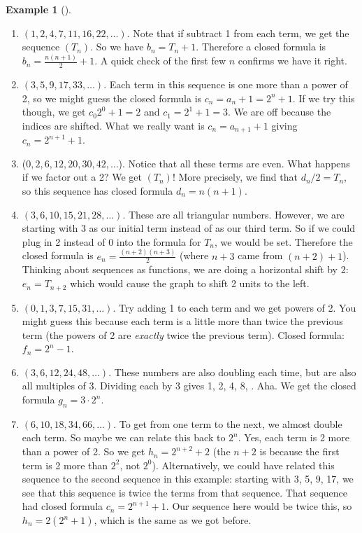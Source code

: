 \documentclass[12pt,]{book}
\theoremstyle{plain}
\theoremstyle{definition}
\theoremstyle{definition}
\newtheorem{example}[theorem]{Example}
\theoremstyle{definition}
\numberwithin{equation}{chapter}
\begin{document}
\begin{example}[]
\begin{enumerate}
\item\hypertarget{li-42}{}\hypertarget{p-70}{}%
\((1, 2, 4, 7, 11, 16, 22, \ldots)\). Note that if subtract 1 from each term, we get the sequence \((T_n)\). So we have \(b_n = T_n + 1\). Therefore a closed formula is \(b_n = \frac{n(n+1)}{2} + 1\). A quick check of the first few \(n\) confirms we have it right.%
\item\hypertarget{li-43}{}\hypertarget{p-71}{}%
\((3, 5, 9, 17, 33, \ldots )\). Each term in this sequence is one more than a power of 2, so we might guess the closed formula is \(c_n = a_n+1 = 2^n + 1\). If we try this though, we get \(c_0 2^0 + 1 = 2\) and \(c_1 = 2^1 + 1 = 3\). We are off because the indices are shifted.  What we really want is \(c_n = a_{n+1}+1\) giving  \(c_n = 2^{n+1} + 1\).%
\item\hypertarget{li-44}{}\hypertarget{p-72}{}%
(\(0, 2, 6, 12, 20, 30, 42,\ldots \)). Notice that all these terms are even. What happens if we factor out a 2? We get \((T_n)\)! More precisely, we find that \(d_n/2 = T_n\), so this sequence has closed formula \(d_n = n(n+1)\).%
\item\hypertarget{li-45}{}\hypertarget{p-73}{}%
\((3, 6, 10, 15, 21, 28, \ldots)\). These are all triangular numbers. However, we are starting with 3 as our initial term instead of as our third term. So if we could plug in 2 instead of 0 into the formula for \(T_n\), we would be set. Therefore the closed formula is \(e_n = \frac{(n+2)(n+3)}{2}\) (where \(n+3\) came from \((n+2)+1\)).  Thinking about sequences as functions, we are doing a horizontal shift by 2: \(e_n = T_{n+2}\) which would cause the graph to shift 2 units to the left.%
\item\hypertarget{li-46}{}\hypertarget{p-74}{}%
\((0, 1, 3, 7, 15, 31, \ldots )\). Try adding 1 to each term and we get powers of 2. You might guess this because each term is a little more than twice the previous term (the powers of 2 are \emph{exactly} twice the previous term). Closed formula: \(f_n = 2^{n} - 1\).%
\item\hypertarget{li-47}{}\hypertarget{p-75}{}%
\((3, 6, 12, 24, 48, \ldots )\). These numbers are also doubling each time, but are also all multiples of 3. Dividing each by 3   gives 1, 2, 4, 8, \textellipsis{}. Aha. We get the closed formula \(g_n = 3\cdot 2^{n}\).%
\item\hypertarget{li-48}{}\hypertarget{p-76}{}%
\((6, 10, 18, 34, 66, \ldots )\). To get from one term to the next, we almost double each term. So maybe we can relate this back to \(2^n\). Yes, each term is 2 more than a power of 2. So we get \(h_n = 2^{n+2} + 2\) (the \(n+2\) is because the first term is 2 more than \(2^2\), not \(2^0\)). Alternatively, we could have related this sequence to the second sequence in this example: starting with 3, 5, 9, 17, \textellipsis{} we see that this sequence is twice the terms from that sequence. That sequence had closed formula \(c_n = 2^{n+1} + 1\). Our sequence here would be twice this, so \(h_n = 2(2^n + 1)\), which is the same as we got before.%

\end{enumerate}
\end{example}
\end{document}
